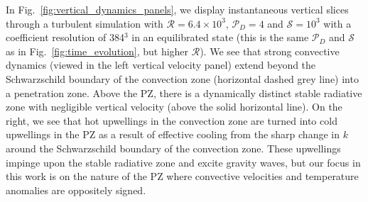 \documentclass[twocolumn]{aastex631}
\newcommand{\mP}{\ensuremath{\mathcal{P}}}
\newcommand{\mR}{\ensuremath{\mathcal{R}}}
\newcommand{\mS}{\ensuremath{\mathcal{S}}}
\begin{document}
In Fig.~\ref{fig:vertical_dynamics_panels}, we display instantaneous vertical slices through a turbulent simulation with $\mR = 6.4 \times 10^3$, $\mP_D = 4$ and $\mS = 10^3$ with a coefficient resolution of 384$^3$ in an equilibrated state (this is the same $\mP_D$ and $\mS$ as in Fig.~\ref{fig:time_evolution}, but higher $\mR$).
We see that strong convective dynamics (viewed in the left vertical velocity panel) extend beyond the Schwarzschild boundary of the convection zone (horizontal dashed grey line) into a penetration zone.
Above the PZ, there is a dynamically distinct stable radiative zone with negligible vertical velocity (above the solid horizontal line).
On the right, we see that hot upwellings in the convection zone are turned into cold upwellings in the PZ as a result of effective cooling from the sharp change in $k$ around the Schwarzschild boundary of the convection zone.
These upwellings impinge upon the stable radiative zone and excite gravity waves, but our focus in this work is on the nature of the PZ where convective velocities and temperature anomalies are oppositely signed.
\end{document}
